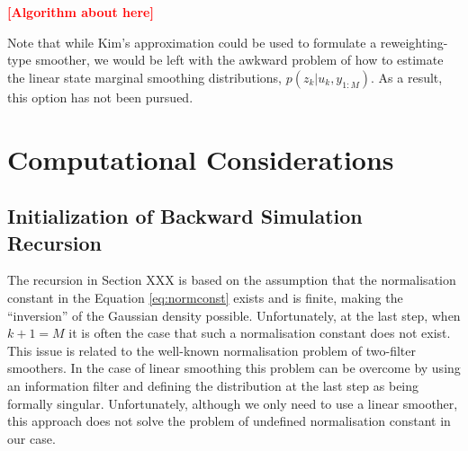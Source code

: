 \documentclass[twocolumn]{autart}    %
\newcommand{\comment}[1]{\textcolor{red}{\textbf{[#1]}}}
\begin{document}
\comment{Algorithm about here}

Note that while Kim's approximation could be used to formulate a reweighting-type smoother, we would be left with the awkward problem of how to estimate the linear state marginal smoothing distributions, $p(z_k | u_k, y_{1:M})$. As a result, this option has not been pursued.

%
%



\section{Computational Considerations}

\subsection{Initialization of Backward Simulation Recursion}
%
The recursion in Section XXX is based on the assumption that the normalisation constant in the Equation \eqref{eq:normconst} exists and is finite, making the ``inversion'' of the Gaussian density possible.  Unfortunately, at the last step, when $k+1 = M$ it is often the case that such a normalisation constant does not exist. This issue is related to the well-known normalisation problem of two-filter smoothers. In the case of linear smoothing this problem can be overcome by using an information filter and defining the distribution at the last step as being formally singular. Unfortunately, although we only need to use a linear smoother, this approach does not solve the problem of undefined normalisation constant in our case.
\end{document}
